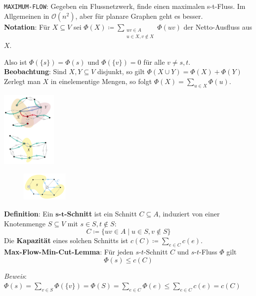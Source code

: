 \texttt{MAXIMUM-FLOW}: Gegeben ein Flussnetzwerk, finde einen maximalen s-t-Fluss. Im Allgemeinen in $\mathcal{O}(n^2)$, aber für planare Graphen geht es besser.\\

\textbf{Notation}: Für $X\subseteq V$ sei $\Phi(X)\coloneqq \sum\limits_{\substack{uv\in A \\ u\in X, v\notin X}}\Phi(uv)$ der Netto-Ausfluss aus $X$. 

Also ist $\Phi(\{s\})=\Phi(s)$ und $\Phi(\{v\})=0$ für alle $v\neq s,t$.\\

\textbf{Beobachtung}: Sind $X,Y\subseteq V$ disjunkt, so gilt $\Phi(X\cup Y)=\Phi(X)+\Phi(Y)$ Zerlegt man $X$ in einelementige Mengen, so folgt $\Phi(X)=\sum\limits_{u\in X}\Phi(u)$.
\begin{center}
	\includegraphics[width=0.2\textwidth]{images/fnet-2.png}
\end{center}

\begin{figure}
	\centering
	\vspace{0pt}
	\includegraphics[width=0.2\textwidth]{images/s-t-cut.png}
	\vspace{40pt}
	\vspace{-800pt}
\end{figure}
\textbf{Definition}: Ein \textbf{$\boldsymbol{s}$-$\boldsymbol{t}$-Schnitt} ist ein Schnitt $C\subseteq A$, induziert von einer Knotenmenge $S\subseteq V$ mit $s\in S,t\notin S$:
$$C\coloneqq\{uv\in A\mid u\in S, v\notin S\}$$
Die \textbf{Kapazität} eines solchen Schnitts ist $c(C)\coloneqq \sum\limits_{e\in C}c(e)$.\\


\textbf{Max-Flow-Min-Cut-Lemma}: Für jeden $s$-$t$-Schnitt $C$ und $s$-$t$-Fluss $\Phi$ gilt $$\Phi(s)\leq c(C)$$

\textit{Beweis}: $\Phi(s)=\sum\limits_{v\in S}\Phi(\{v\})=\Phi(S)=\sum\limits_{e\in C}\Phi(e)\leq\sum\limits_{e\in C}c(e)=c(C)$

